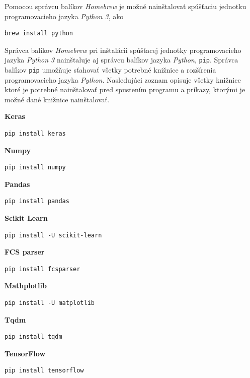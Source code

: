 Pomocou správcu balíkov \textit{Homebrew} je možné nainštalovať spúšťaciu jednotku programovacieho jazyka \textit{Python 3}, ako

\begin{Verbatim}[breaklines=true, breakanywhere=true]
brew install python
\end{Verbatim}

Správca balíkov \textit{Homebrew} pri inštalácii spúšťacej jednotky programovacieho jazyka \textit{Python 3} nainštaluje aj správcu balíkov jazyka \textit{Python}, \texttt{pip}. Správca balíkov \texttt{pip} umožňuje sťahovať všetky potrebné knižnice a rozšírenia programovacieho jazyka \textit{Python}. Nasledujúci zoznam opisuje všetky knižnice ktoré je potrebné nainštalovať pred spustením programu a príkazy, ktorými je možné dané knižnice nainštalovať.

\textbf{Keras}
\begin{Verbatim}[breaklines=true, breakanywhere=true]
pip install keras
\end{Verbatim}

\textbf{Numpy}
\begin{Verbatim}[breaklines=true, breakanywhere=true]
pip install numpy
\end{Verbatim}

\textbf{Pandas}
\begin{Verbatim}[breaklines=true, breakanywhere=true]
pip install pandas
\end{Verbatim}

\textbf{Scikit Learn}
\begin{Verbatim}[breaklines=true, breakanywhere=true]
pip install -U scikit-learn
\end{Verbatim}

\textbf{FCS parser}
\begin{Verbatim}[breaklines=true, breakanywhere=true]
pip install fcsparser
\end{Verbatim}

\textbf{Mathplotlib}
\begin{Verbatim}[breaklines=true, breakanywhere=true]
pip install -U matplotlib
\end{Verbatim}

\textbf{Tqdm}
\begin{Verbatim}[breaklines=true, breakanywhere=true]
pip install tqdm
\end{Verbatim}

\textbf{TensorFlow}
\begin{Verbatim}[breaklines=true, breakanywhere=true]
pip install tensorflow
\end{Verbatim}

